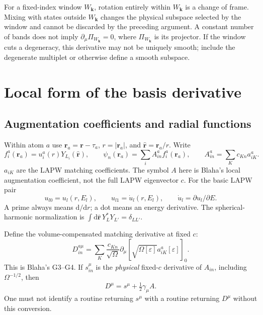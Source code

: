 \documentclass[11pt]{article}
\newcommand{\dd}{\mathrm d}
\newcommand{\kb}{\mathbf k}
\newcommand{\pa}{\partial_\mu}
\newcommand{\newpart}[1]{\par\Needspace{12\baselineskip}\section{#1}}
\begin{document}
For a fixed-index window $W_\kb$, rotation entirely within $W_\kb$ is a
change of frame. Mixing with states outside $W_\kb$ changes the physical
subspace selected by the window and cannot be discarded by the preceding
argument. A constant number of bands does not imply
$\partial_\mu\Pi_{W_\kb}=0$, where $\Pi_{W_\kb}$ is its projector.
If the window cuts a degeneracy, this derivative may not be uniquely
smooth; include the degenerate multiplet or otherwise define a smooth
subspace.

\newpart{Local form of the basis derivative}
\label{sec:local}
\subsection{Augmentation coefficients and radial functions}
Within atom $a$ use $\mathbf r_a=\mathbf r-\tau_a$,
$r=|\mathbf r_a|$, and $\widehat{\mathbf r}=\mathbf r_a/r$. Write
\begin{equation}
 f_i^a(\mathbf r_a)=u_i^a(r)Y_{L_i}(\widehat{\mathbf r}),\qquad
 \psi_n(\mathbf r_a)=\sum_i A^a_{in}f_i^a(\mathbf r_a),\qquad
 A^a_{in}=\sum_K c_{Kn}a^a_{iK}.
 \label{eq:localA}
\end{equation}
$a_{iK}$ are the LAPW matching coefficients. The symbol $A$ here is
Blaha's local augmentation coefficient, not the full LAPW eigenvector $c$.
For the basic LAPW pair
\begin{equation}
 u_{l0}=u_l(r,E_l),\qquad u_{l1}=\dot u_l(r,E_l),
 \qquad \dot u_l=\partial u_l/\partial E.
\end{equation}
A prime always means $\dd/\dd r$; a dot means an energy derivative.
The spherical-harmonic normalization is
$\int\dd\widehat{\mathbf r}\,Y_L^*Y_{L'}=\delta_{LL'}$.

Define the volume-compensated matching derivative at fixed $c$:
\begin{equation}
 D^{a\mu}_{in}=\sum_K\frac{c_{Kn}}{\sqrt\Omega}
        \pa[\sqrt{\Omega[\varepsilon]}a^a_{iK}[\varepsilon]]_0.
 \label{eq:D}
\end{equation}
This is Blaha's G3--G4. If $s_{in}^\mu$ is the \emph{physical}
fixed-$c$ derivative of $A_{in}$, including $\Omega^{-1/2}$, then
\begin{equation}
 D^\mu=s^\mu+\tfrac12\gamma_\mu A.
 \label{eq:DvsS}
\end{equation}
One must not identify a routine returning $s^\mu$ with a routine
returning $D^\mu$ without this conversion.
\end{document}
